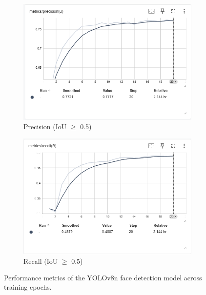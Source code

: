 \begin{figure}[H]
	\vspace{1em}
	
	\begin{subfigure}[b]{0.48\textwidth}
		\includegraphics[width=\textwidth]{figures/chapter4/precision.png}
		\caption{Precision (IoU $\geq$ 0.5)}
	\end{subfigure}
	\hfill
	\begin{subfigure}[b]{0.48\textwidth}
		\includegraphics[width=\textwidth]{figures/chapter4/recall.png}
		\caption{Recall (IoU $\geq$ 0.5)}
	\end{subfigure}
	
	\caption{Performance metrics of the YOLOv8n face detection model across training epochs.}
	\label{fig:yolo-metrics}
\end{figure}





